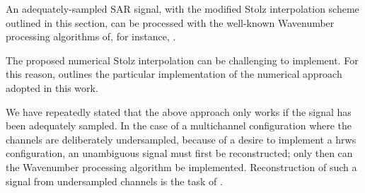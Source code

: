 An adequately-sampled SAR signal, with the modified Stolz interpolation scheme outlined in this section, can be processed with the well-known Wavenumber processing algorithms of, for instance, \cite{Bamler1992, Cumming2003, Cafforio1991a}.
\par
The proposed numerical Stolz interpolation can be challenging to implement. For this reason,  outlines the particular implementation of the numerical approach adopted in this work. 
\par
We have repeatedly stated that the above approach only works if the signal has been adequately sampled. In the case of a multichannel configuration where the channels are deliberately undersampled, because of a desire to implement a \gls{hrws} configuration, an unambiguous signal must first be reconstructed; only then can the Wavenumber processing algorithm be implemented. Reconstruction of such a signal from undersampled channels is the task of .
